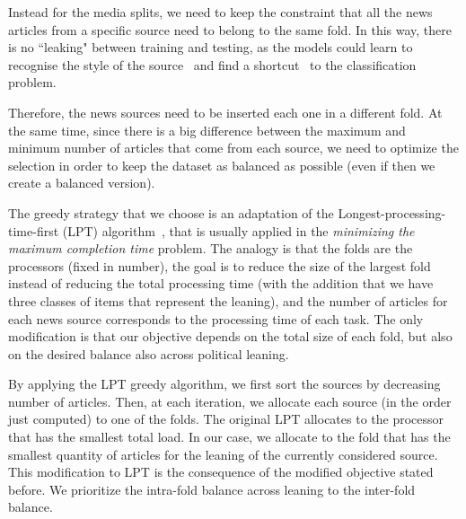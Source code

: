 Instead for the media splits, we need to keep the constraint that all the news articles from a specific source need to belong to the same fold. In this way, there is no ``leaking" between training and testing, as the models could learn to recognise the style of the source~\citep{baly2020we} and find a shortcut~\citep{geirhos2020shortcut} to the classification problem.

Therefore, the news sources need to be inserted each one in a different fold. At the same time, since there is a big difference between the maximum and minimum number of articles that come from each source, we need to optimize the selection in order to keep the dataset as balanced as possible (even if then we create a balanced version).


The greedy strategy that we choose is an adaptation of the Longest-processing-time-first (LPT) algorithm~\citep{graham1969bounds}, that is usually applied in the \emph{minimizing the maximum completion time} problem.
The analogy is that the folds are the processors (fixed in number), the goal is to reduce the size of the largest fold instead of reducing the total processing time (with the addition that we have three classes of items that represent the leaning), and the number of articles for each news source corresponds to the processing time of each task.
The only modification is that our objective depends on the total size of each fold, but also on the desired balance also across political leaning.

By applying the LPT greedy algorithm, we first sort the sources by decreasing number of articles. Then, at each iteration, we allocate each source (in the order just computed) to one of the folds. The original LPT allocates to the processor that has the smallest total load. In our case, we allocate to the fold that has the smallest quantity of articles for the leaning of the currently considered source.
This modification to LPT is the consequence of the modified objective stated before.
We prioritize the intra-fold balance across leaning to the inter-fold balance.



